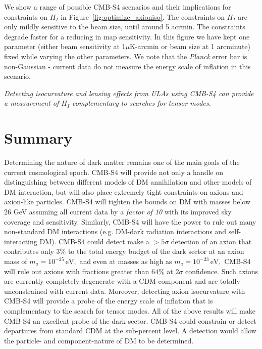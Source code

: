 We show a range of possible CMB-S4 scenarios and their implications for constraints on $H_I$ in Figure~\ref{fig:optimize_axioniso}. The constraints on $H_I$ are only mildly sensitive to the beam size, until around 5 acrmin. The constraints degrade faster for a reducing in map sensitivity. In this figure we have kept one parameter (either beam sensitivity at 1$\mu$K-arcmin or beam size at 1 arcminute) fixed while varying the other parameters. We note that the \textit{Planck} error bar is non-Gaussian - current data do not measure the energy scale of inflation in this scenario.

\emph{Detecting isocurvature and lensing effects from ULAs using CMB-S4 can provide a measurement of $H_I$ complementary to searches for tensor modes.}%

 
\section{Summary}
Determining the nature of dark matter remains one of the main goals of the current cosmological epoch. CMB-S4 will provide not only a handle on distinguishing between different models of DM annihilation and other models of DM interaction, but will also place extremely tight constraints on axions and axion-like particles. CMB-S4 will tighten the bounds on DM with masses below 26 GeV assuming all current data by a \textit{factor of 10} with its improved sky coverage and sensitivity. Similarly, CMB-S4 will have the power to rule out many non-standard DM interactions (e.g. DM-dark radiation interactions and self-interacting DM). 
CMB-S4 could detect make a $>5\sigma$ detection of an axion that contributes only $3\%$ to the total energy budget of the dark sector at an axion mass of $m_a=10^{-25}\,\mathrm{eV},$ and even at masses as high as $m_a=10^{-23}\,\mathrm{eV},$ CMB-S4 will rule out axions with fractions greater than $64\%$ at $2\sigma$ confidence. Such axions are currently completely degenerate with a CDM component and are totally unconstrained with current data.  Moreover, detecting axion isocurvature with CMB-S4 will provide a probe of the energy scale of inflation that is complementary to the search for tensor modes. 
All of the above results will make CMB-S4 an excellent probe of the dark sector. CMB-S4 could constrain or detect departures from standard CDM at the sub-percent level. A detection would allow the particle- and component-nature of DM to be determined.

